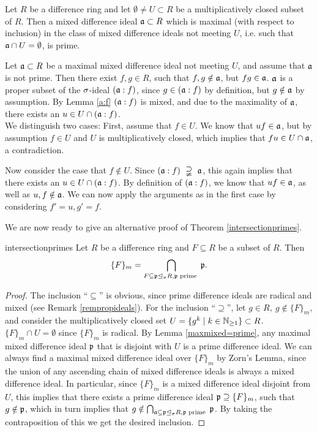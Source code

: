 \begin{lem}
\begin{bew}
\end{bew}
\end{lem}

\begin{lem}\label{maxmixed=prime}
Let $R$ be a difference ring and let $\emptyset \neq U \subset R$ be a multiplicatively closed subset of $R$. Then a mixed difference ideal $\mathfrak{a} \subset R$ which is maximal (with respect to inclusion) in the class of mixed difference
ideals not meeting $U$, i.e. such that $\mathfrak{a} \cap U = \emptyset$, is prime. 
\begin{bew}
Let $\mathfrak{a} \subset R$ be a maximal mixed difference ideal not meeting $U$, and assume that $\mathfrak{a}$ is not prime. Then there exist $f, g \in R$, such that $f,g \notin \mathfrak{a}$, but $fg \in \mathfrak{a}$.
$\mathfrak{a}$ is a proper subset of the $\sigma$-ideal $(\mathfrak{a}:f)$, since $g \in (\mathfrak{a}:f)$ by definition, but $g \notin \mathfrak{a}$ by assumption. By Lemma \ref{a:f} $(\mathfrak{a}:f)$ is mixed, and due to the maximality of $\mathfrak{a}$, there exists an $u \in U \cap (\mathfrak{a}:f)$. \\

We distinguish two cases: First, assume that $f \in U$.  We know that $uf \in \mathfrak{a}$, but by assumption $f \in U$ and $U$ is multiplicatively closed, which implies that $fu \in U \cap \mathfrak{a}$, a contradiction.

Now consider the case that $f \notin U$. Since $(\mathfrak{a}:f)~\supsetneqq~\mathfrak{a}$, this again implies that there exists an $u \in U \cap (\mathfrak{a}:f)$. By definition of $(\mathfrak{a}:f)$, we know that $uf \in \mathfrak{a}$, as well as $u,f \notin \mathfrak{a}$. We can now apply the arguments as in the first case by considering $f' = u, g' = f$.
\end{bew}
\end{lem}

We are now ready to give an alternative proof of Theorem \ref{intersectionprimes}.

\begin{reptheorem}{intersectionprimes}
Let $R$ be a difference ring and $F \subseteq R$ be a subset of $R$. Then
\[ \{ F \}_m = \bigcap_{F \subseteq \mathfrak{p} \unlhd_{\sigma} R, \mathfrak{p} \text{ prime }} \mathfrak{p}.\]
\begin{proof}
The inclusion ``$\subseteq$'' is obvious, since prime difference ideals are radical and mixed (see Remark \ref{rempropideals}). For the inclusion ``$\supseteq$'', let $g \in R, ~ g \notin \{ F \}_m$, and consider the multiplicatively closed set $U = \{ g^k \mid k \in \mathbb{N}_{\geq1} \} \subset R$. 
$\{ F \}_m \cap U = \emptyset$ since $\{ F \}_m$ is radical. By Lemma \ref{maxmixed=prime}, any maximal mixed difference ideal $\mathfrak{p}$ that is disjoint with $U$ is a prime difference ideal. We can always find a maximal mixed difference ideal over $\{F\}_m$ by Zorn's Lemma, since
the union of any ascending chain of mixed difference ideals is always a mixed difference ideal. In particular, since $\{F\}_m$ is a mixed difference ideal disjoint from $U$, this implies that there exists a prime difference ideal $\mathfrak{p} \supseteq \{F\}_m$, such that $g \notin \mathfrak{p}$,
which in turn implies that $g \notin \bigcap_{\mathfrak{a} \subseteq \mathfrak{p} \unlhd_{\sigma} R, \mathfrak{p} \text{ prime }} \mathfrak{p}$. By taking the contraposition of this we get the desired inclusion.
\end{proof}
\end{reptheorem}

